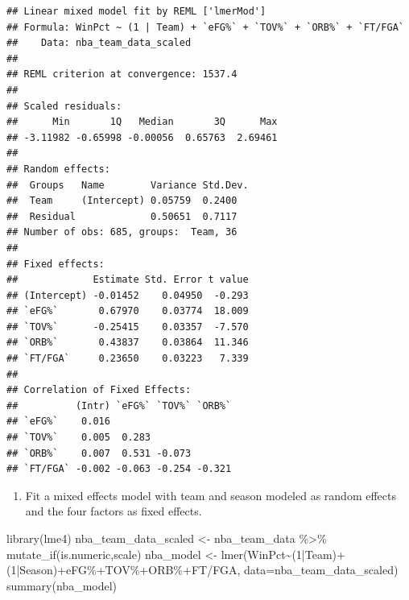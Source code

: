 \documentclass[
  11pt,
]{book}
\newenvironment{Shaded}{\begin{snugshade}}{\end{snugshade}}
\newcommand{\AttributeTok}[1]{\textcolor[rgb]{0.77,0.63,0.00}{#1}}
\newcommand{\DecValTok}[1]{\textcolor[rgb]{0.00,0.00,0.81}{#1}}
\newcommand{\FunctionTok}[1]{\textcolor[rgb]{0.00,0.00,0.00}{#1}}
\newcommand{\NormalTok}[1]{#1}
\newcommand{\OtherTok}[1]{\textcolor[rgb]{0.56,0.35,0.01}{#1}}
\newcommand{\SpecialCharTok}[1]{\textcolor[rgb]{0.00,0.00,0.00}{#1}}
\newcommand{\StringTok}[1]{\textcolor[rgb]{0.31,0.60,0.02}{#1}}
\providecommand{\tightlist}{%
  \setlength{\itemsep}{0pt}\setlength{\parskip}{0pt}}
\theoremstyle{definition}
\theoremstyle{definition}
\theoremstyle{definition}
\theoremstyle{definition}
\theoremstyle{remark}
\begin{document}
\begin{verbatim}
## Linear mixed model fit by REML ['lmerMod']
## Formula: WinPct ~ (1 | Team) + `eFG%` + `TOV%` + `ORB%` + `FT/FGA`
##    Data: nba_team_data_scaled
## 
## REML criterion at convergence: 1537.4
## 
## Scaled residuals: 
##      Min       1Q   Median       3Q      Max 
## -3.11982 -0.65998 -0.00056  0.65763  2.69461 
## 
## Random effects:
##  Groups   Name        Variance Std.Dev.
##  Team     (Intercept) 0.05759  0.2400  
##  Residual             0.50651  0.7117  
## Number of obs: 685, groups:  Team, 36
## 
## Fixed effects:
##             Estimate Std. Error t value
## (Intercept) -0.01452    0.04950  -0.293
## `eFG%`       0.67970    0.03774  18.009
## `TOV%`      -0.25415    0.03357  -7.570
## `ORB%`       0.43837    0.03864  11.346
## `FT/FGA`     0.23650    0.03223   7.339
## 
## Correlation of Fixed Effects:
##          (Intr) `eFG%` `TOV%` `ORB%`
## `eFG%`    0.016                     
## `TOV%`    0.005  0.283              
## `ORB%`    0.007  0.531 -0.073       
## `FT/FGA` -0.002 -0.063 -0.254 -0.321
\end{verbatim}

\newpage

\begin{enumerate}
\def\labelenumi{(\alph{enumi})}
\setcounter{enumi}{3}
\tightlist
\item
  Fit a mixed effects model with team and season modeled as random effects and the four factors as fixed effects.
\end{enumerate}

\begin{Shaded}
\begin{Highlighting}[]
\FunctionTok{library}\NormalTok{(lme4)}
\NormalTok{nba\_team\_data\_scaled }\OtherTok{\textless{}{-}}\NormalTok{ nba\_team\_data }\SpecialCharTok{\%\textgreater{}\%} \FunctionTok{mutate\_if}\NormalTok{(is.numeric,scale)}
\NormalTok{nba\_model }\OtherTok{\textless{}{-}} \FunctionTok{lmer}\NormalTok{(WinPct}\SpecialCharTok{\textasciitilde{}}\NormalTok{(}\DecValTok{1}\SpecialCharTok{|}\NormalTok{Team)}\SpecialCharTok{+}\NormalTok{(}\DecValTok{1}\SpecialCharTok{|}\NormalTok{Season)}\SpecialCharTok{+}\StringTok{\textasciigrave{}}\AttributeTok{eFG\%}\StringTok{\textasciigrave{}}\SpecialCharTok{+}\StringTok{\textasciigrave{}}\AttributeTok{TOV\%}\StringTok{\textasciigrave{}}\SpecialCharTok{+}\StringTok{\textasciigrave{}}\AttributeTok{ORB\%}\StringTok{\textasciigrave{}}\SpecialCharTok{+}\StringTok{\textasciigrave{}}\AttributeTok{FT/FGA}\StringTok{\textasciigrave{}}\NormalTok{,}
                  \AttributeTok{data=}\NormalTok{nba\_team\_data\_scaled)}
\FunctionTok{summary}\NormalTok{(nba\_model)}
\end{Highlighting}
\end{Shaded}
\end{document}
